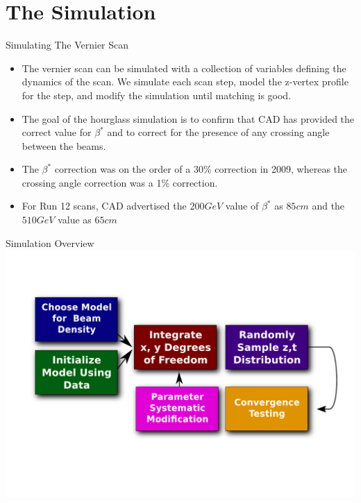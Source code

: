 \section{The Simulation}
\label{HourglassSimulation}

\begin{frame}{Simulating The Vernier Scan}
\begin{itemize}
\item The vernier scan can be simulated with a collection of variables defining
the dynamics of the scan. We simulate each scan step, model the z-vertex
profile for the step, and modify the simulation until matching is good.

\item The goal of the hourglass simulation is to confirm that CAD has provided
the correct value for $\beta^*$ and to correct for the presence of any
crossing angle between the beams.

\item The $\beta^*$ correction was on the order of a 30\% correction in 2009,
whereas the crossing angle correction was a 1\% correction.

\item For Run 12 scans, CAD advertised the $200 GeV$ value of $\beta^*$ as $85 cm$ and the
$510 GeV$ value as $65 cm$
\end{itemize}
\end{frame}

\begin{frame}{Simulation Overview}
\includegraphics[height=\textheight]{../HourglassSimulation/figs/simulation_flow.pdf}
\end{frame}

